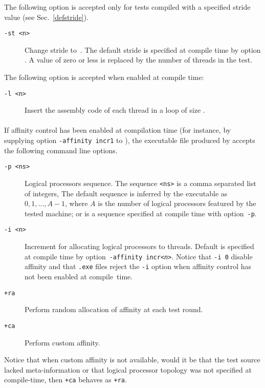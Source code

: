 \label{st}The following option is accepted only for tests compiled
with a specified stride value (see Sec.~\ref{defstride}).
\begin{description}
\item[{\tt -st <n>}] Change stride to~.
The default stride is specified at compile time by \litmus{}
option .
A value of zero or less is replaced by the number of threads in the test.
\end{description}


The following option is accepted when enabled at compile time:
\begin{description}
\item[{\tt -l <n>}]
Insert the assembly code of each thread in a loop of size .
\end{description}

\paragraph{}
If affinity control has been enabled at compilation time
(for instance, by supplying option \texttt{-affinity incr1}
to \litmus),
the  executable file produced by \litmus{} accepts the following
command line options.
\begin{description}
\item[{\tt -p <ns>}] Logical processors sequence.
The sequence \texttt{<ns>} is a comma separated list of integers,
The default sequence is inferred by the executable as $0,1,\ldots,A-1$,
where $A$ is the number of logical processors featured by the tested machine;
or is a sequence specified at compile time
with \litmus{} option~\texttt{-p}.
\item[{\tt -i <n>}] Increment for allocating logical processors to threads.
Default is specified at compile time by \litmus{} option~\texttt{-affinity
incr<\textit{n}>}.
Notice that \texttt{-i 0} disable affinity
and that \texttt{.exe} files reject the \texttt{-i} option when affinity
control has not been enabled at compile~time.
\item[{\tt +ra}] Perform random allocation of affinity at each test round.
\item[{\tt +ca}] Perform custom affinity.
\end{description}
Notice that when custom affinity is not available, would it be that
the test source lacked meta-information or that logical processor
topology was not specified at compile-time, then \texttt{+ca}
behaves as \texttt{+ra}.

